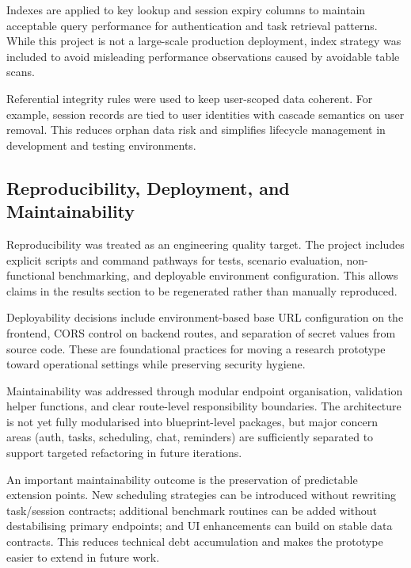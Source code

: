 \documentclass[12pt]{article}
\begin{document}
Indexes are applied to key lookup and session expiry columns to maintain acceptable query performance for authentication and task retrieval patterns. While this project is not a large-scale production deployment, index strategy was included to avoid misleading performance observations caused by avoidable table scans.

Referential integrity rules were used to keep user-scoped data coherent. For example, session records are tied to user identities with cascade semantics on user removal. This reduces orphan data risk and simplifies lifecycle management in development and testing environments.

\subsection{Reproducibility, Deployment, and Maintainability}
Reproducibility was treated as an engineering quality target. The project includes explicit scripts and command pathways for tests, scenario evaluation, non-functional benchmarking, and deployable environment configuration. This allows claims in the results section to be regenerated rather than manually reproduced.

Deployability decisions include environment-based base URL configuration on the frontend, CORS control on backend routes, and separation of secret values from source code. These are foundational practices for moving a research prototype toward operational settings while preserving security hygiene.

Maintainability was addressed through modular endpoint organisation, validation helper functions, and clear route-level responsibility boundaries. The architecture is not yet fully modularised into blueprint-level packages, but major concern areas (auth, tasks, scheduling, chat, reminders) are sufficiently separated to support targeted refactoring in future iterations.

An important maintainability outcome is the preservation of predictable extension points. New scheduling strategies can be introduced without rewriting task/session contracts; additional benchmark routines can be added without destabilising primary endpoints; and UI enhancements can build on stable data contracts. This reduces technical debt accumulation and makes the prototype easier to extend in future work.
\end{document}

